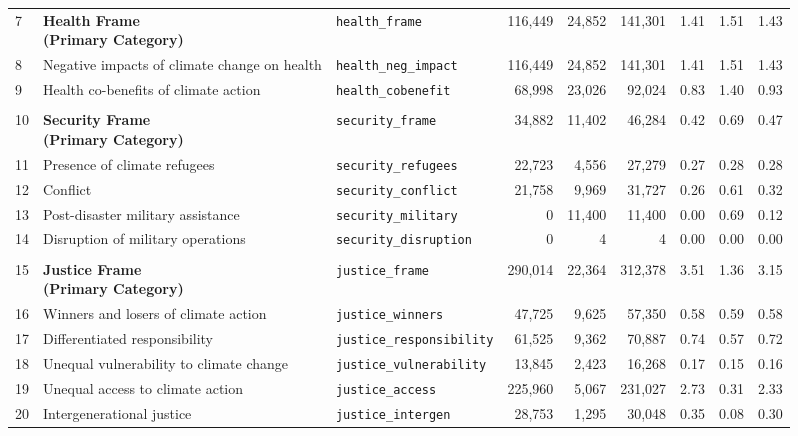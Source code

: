 \begin{longtable}{p{0.5cm}p{4.0cm}p{2.5cm}rrrrrr}
\midrule
7 & \textbf{Health Frame\newline (Primary Category)} & \texttt{health\_frame} & 116,449 & 24,852 & 141,301 & 1.41 & 1.51 & 1.43 \\
\cmidrule(lr){1-9}
8 & Negative impacts of climate change on health & \texttt{health\_neg\_impact} & 116,449 & 24,852 & 141,301 & 1.41 & 1.51 & 1.43 \\
9 & Health co-benefits of climate action & \texttt{health\_cobenefit} & 68,998 & 23,026 & 92,024 & 0.83 & 1.40 & 0.93 \\
\midrule
\rowcolor{gray!8}
\multicolumn{9}{l}{\textit{Security Frame}} \\
\midrule
10 & \textbf{Security Frame\newline (Primary Category)} & \texttt{security\_frame} & 34,882 & 11,402 & 46,284 & 0.42 & 0.69 & 0.47 \\
\cmidrule(lr){1-9}
11 & Presence of climate refugees & \texttt{security\_refugees} & 22,723 & 4,556 & 27,279 & 0.27 & 0.28 & 0.28 \\
12 & Conflict & \texttt{security\_conflict} & 21,758 & 9,969 & 31,727 & 0.26 & 0.61 & 0.32 \\
13 & Post-disaster military assistance & \texttt{security\_military} & 0 & 11,400 & 11,400 & 0.00 & 0.69 & 0.12 \\
14 & Disruption of military operations & \texttt{security\_disruption} & 0 & 4 & 4 & 0.00 & 0.00 & 0.00 \\
\midrule
\rowcolor{gray!8}
\multicolumn{9}{l}{\textit{Justice Frame}} \\
\midrule
15 & \textbf{Justice Frame\newline (Primary Category)} & \texttt{justice\_frame} & 290,014 & 22,364 & 312,378 & 3.51 & 1.36 & 3.15 \\
\cmidrule(lr){1-9}
16 & Winners and losers of climate action & \texttt{justice\_winners} & 47,725 & 9,625 & 57,350 & 0.58 & 0.59 & 0.58 \\
17 & Differentiated responsibility & \texttt{justice\_responsibility} & 61,525 & 9,362 & 70,887 & 0.74 & 0.57 & 0.72 \\
18 & Unequal vulnerability to climate change & \texttt{justice\_vulnerability} & 13,845 & 2,423 & 16,268 & 0.17 & 0.15 & 0.16 \\
19 & Unequal access to climate action & \texttt{justice\_access} & 225,960 & 5,067 & 231,027 & 2.73 & 0.31 & 2.33 \\
20 & Intergenerational justice & \texttt{justice\_intergen} & 28,753 & 1,295 & 30,048 & 0.35 & 0.08 & 0.30 \\

\end{longtable}
